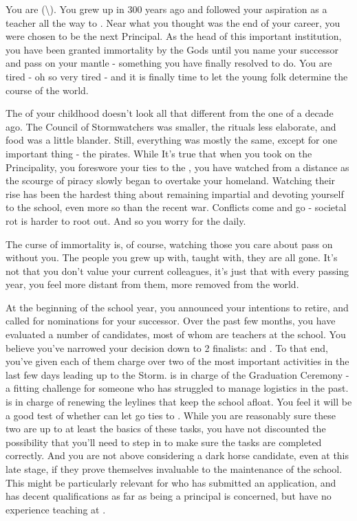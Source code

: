 \documentclass[char]{GL2020}
\begin{document}
\name{\cPrincipal{}}


You are \cPrincipal{} (\cPrincipal{\they}\textbackslash\cPrincipal{\them}). You grew up in \pShip{} 300 years ago and followed your aspiration as a teacher all the way to \pSchool{}. Near what you thought was the end of your career, you were chosen to be the next Principal. As the head of this important institution, you have been granted immortality by the Gods until you name your successor and pass on your mantle - something you have finally resolved to do. You are tired - oh so very tired - and it is finally time to let the young folk determine the course of the world.

The \pShip{} of your childhood doesn’t look all that different from the one of a decade ago. The Council of Stormwatchers was smaller, the rituals less elaborate, and food was a little blander. Still, everything was mostly the same, except for one important thing - the pirates. While It’s true that when you took on the Principality, you foreswore your ties to the \pShippies{}, you have watched from a distance as the scourge of piracy slowly began to overtake your homeland. Watching their rise has been the hardest thing about remaining impartial and devoting yourself to the school, even more so than the recent war. Conflicts come and go - societal rot is harder to root out. And so you worry for the \pShip{} daily.

The curse of immortality is, of course, watching those you care about pass on without you. The people you grew up with, taught with, they are all gone. It’s not that you don’t value your current colleagues, it's just that with every passing year, you feel more distant from them, more removed from the world.

At the beginning of the school year, you announced your intentions to retire, and called for nominations for your successor. Over the past few months, you have evaluated a number of candidates, most of whom are teachers at the school. You believe you’ve narrowed your decision down to 2 finalists: \cMusic{} and \cBeetle{}. To that end, you’ve given each of them charge over two of the most important activities in the last few days leading up to the Storm. \cMusic{} is in charge of the Graduation Ceremony - a fitting challenge for someone who has struggled to manage logistics in the past. \cBeetle{} is in charge of renewing the leylines that keep the school afloat. You feel it will be a good test of whether \cBeetle{\they} can let go \cBeetle{\their} ties to \pTech{}. While you are reasonably sure these two are up to at least the basics of these tasks, you have not discounted the possibility that you’ll need to step in to make sure the tasks are completed correctly. And you are not above considering a dark horse candidate, even at this late stage, if they prove themselves invaluable to the maintenance of the school. This might be particularly relevant for \cEvil{} who has submitted an application, and has decent qualifications as far as being a principal is concerned, but \cEvil{\they} have no experience teaching at \pSchool{}.
\end{document}
